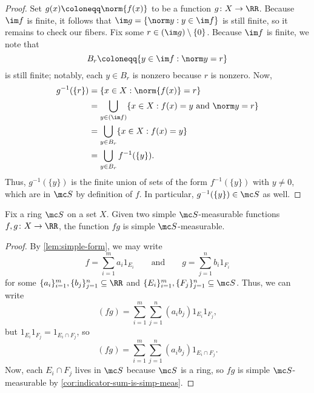 \documentclass[../notes.tex]{subfiles}
\begin{document}
\begin{proof}
	Set $g(x)\coloneqq\norm{f(x)}$ to be a function $g\colon X\to\RR$. Because $\im f$ is finite, it follows that $\im g=\{\norm y:y\in\im f\}$ is still finite, so it remains to check our fibers. Fix some $r\in(\im g)\setminus\{0\}$. Because $\im f$ is finite, we note that
	\[B_r\coloneqq\{y\in\im f:\norm y=r\}\]
	is still finite; notably, each $y\in B_r$ is nonzero because $r$ is nonzero. Now,
	\begin{align*}
		g^{-1}(\{r\}) &= \{x\in X:\norm{f(x)}=r\} \\
		&= \bigcup_{y\in(\im f)}\{x\in X:f(x)=y\text{ and }\norm y=r\} \\
		&= \bigcup_{y\in B_r}\{x\in X:f(x)=y\} \\
		&= \bigcup_{y\in B_r}f^{-1}(\{y\}).
	\end{align*}
	Thus, $g^{-1}(\{y\})$ is the finite union of sets of the form $f^{-1}(\{y\})$ with $y\ne0$, which are in $\mc S$ by definition of $f$. In particular, $g^{-1}(\{y\})\in\mc S$ as well.
\end{proof}
\begin{lemma} \label{lem:prod-of-simp-meas}
	Fix a ring $\mc S$ on a set $X$. Given two simple $\mc S$-measurable functions $f,g\colon X\to\RR$, the function $fg$ is simple $\mc S$-measurable.
\end{lemma}
\begin{proof}
	By \autoref{lem:simple-form}, we may write
	\[f=\sum_{i=1}^ma_i1_{E_i}\qquad\text{and}\qquad g=\sum_{j=1}^nb_i1_{F_i}\]
	for some $\{a_i\}_{i=1}^m,\{b_j\}_{j=1}^n\subseteq\RR$ and $\{E_i\}_{i=1}^m,\{F_j\}_{j=1}^n\subseteq\mc S$. Thus, we can write
	\[(fg)=\sum_{i=1}^m\sum_{j=1}^n(a_ib_j)1_{E_i}1_{F_j},\]
	but $1_{E_i}1_{F_j}=1_{E_i\cap F_j}$, so
	\[(fg)=\sum_{i=1}^m\sum_{j=1}^n(a_ib_j)1_{E_i\cap F_j}.\]
	Now, each $E_i\cap F_j$ lives in $\mc S$ because $\mc S$ is a ring, so $fg$ is simple $\mc S$-measurable by \autoref{cor:indicator-sum-is-simp-meas}.
\end{proof}
\end{document}
